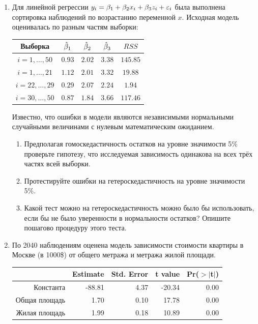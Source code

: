 \documentclass[12pt, a4paper]{article}\usepackage[]{graphicx}\usepackage[]{color}
\begin{document}
\begin{enumerate}
\item Для линейной регрессии $y_i = \beta_1 + \beta_2 x_i + \beta_3 z_i + \varepsilon_i$ была выполнена сортировка наблюдений по возрастанию переменной $x$. Исходная модель оценивалась по разным частям выборки:

\begin{tabular}{c|cccc}
Выборка & $\hat{\beta}_1$ & $\hat{\beta}_2$ & $\hat{\beta}_3$ & $RSS$ \\

\hline
$i=1,\ldots, 50$ & $0.93$ & $2.02$ & $3.38$ & $145.85$ \\
$i=1,\ldots, 21$ & $1.12$ & $2.01$ & $3.32$ & $19.88$ \\
$i=22,\ldots, 29$ & $0.29$ & $2.07$ & $2.24$ & $1.94$ \\
$i=30,\ldots, 50$ & $0.87$ & $1.84$ & $3.66$ & $117.46$ \\
\end{tabular}

Известно, что ошибки в модели являются независимыми нормальными случайными величинами с нулевым математическим ожиданием.

\begin{enumerate}
\item Предполагая гомоскедастичность остатков на уровне значимости 5\% проверьте гипотезу, что исследуемая зависимость одинакова на всех трёх частях всей выборки.
\item Протестируйте ошибки на гетероскедастичность на уровне значимости 5\%.
\item Какой тест можно на гетероскедастичность можно было бы использовать, если бы не было уверенности в нормальности остатков? Опишите пошагово процедуру этого теста.
\end{enumerate}


\item По 2040 наблюдениям оценена модель зависимости стоимости квартиры в Москве (в 1000\$) от общего метража и метража жилой площади.
\begin{table}[ht]
\centering
\begin{tabular}{rrrrr}
  \hline
 & Estimate & Std. Error & t value & Pr($>$$|$t$|$) \\ 
  \hline
Константа & -88.81 & 4.37 & -20.34 & 0.00 \\ 
  Общая площадь & 1.70 & 0.10 & 17.78 & 0.00 \\ 
  Жилая площадь & 1.99 & 0.18 & 10.89 & 0.00 \\ 
   \hline
\end{tabular}
\end{table}



\end{enumerate}
\end{document}
